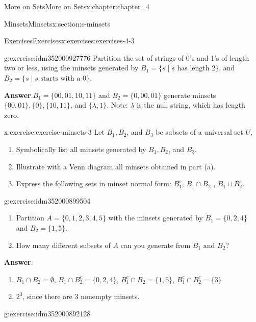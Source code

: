 \documentclass[oneside,10pt,]{book}
\newcommand{\blocktitlefont}{\relax}
\begin{document}
\begin{chapterptx}{More on Sets}{}{More on Sets}{}{}{x:chapter:chapter_4}
\begin{sectionptx}{Minsets}{}{Minsets}{}{}{x:section:s-minsets}
\begin{exercises-subsection}{Exercises}{}{Exercises}{}{}{x:exercises:exercises-4-3}
\begin{divisionexercise}{3}{}{}{g:exercise:idm352000927776}
Partition the set of strings of 0's and 1's of length two or less, using the minsets generated by \(B_1=\{s \mid s \textrm{ has length } 2\}\), and \(B_2= \{s \mid s \textrm{ starts with a }   0\}\).%
\par\smallskip%
\noindent\textbf{\blocktitlefont Answer}.\hypertarget{g:answer:idm352000908720}{}\quad{}\(B_1= \{00, 01, 10, 11\}\) and \(B_2 = \{0, 00, 01\}\) generate minsets \(\{00, 01\}, \{0\}, \{10, 11\}\), and \(\{\lambda , 1\}\). Note: \(\lambda\) is the null string, which has length zero.%
\end{divisionexercise}%
\begin{divisionexercise}{4}{}{}{x:exercise:exercise-minsets-3}%
Let \(B_1, B_2\), and \(B_3\) be subsets of a universal set \(U\),%
\par
%
\begin{enumerate}[label=(\alph*)]
\item{}Symbolically list all minsets generated by \(B_1, B_2\), and \(B_3\).%
\item{}Illustrate with a Venn diagram all minsets obtained in part (a).%
\item{}Express the following sets in minset normal form: \(B_1^c\), \(B_1\cap B_2\) , \(B_1\cup B_2^c\).%
\end{enumerate}
%
\end{divisionexercise}%
\begin{divisionexercise}{5}{}{}{g:exercise:idm352000899504}%
%
\begin{enumerate}[label=(\alph*)]
\item{}Partition \(A = \{0, 1, 2, 3, 4, 5\}\) with the minsets generated by \(B_1= \{0, 2, 4\}\text{  }\)and \(B_2= \{1, 5\}\).%
\item{}How many different subsets of \(A\) can you generate from  \(B_1 \textrm{ and } B_2\)?%
\end{enumerate}
%
\par\smallskip%
\noindent\textbf{\blocktitlefont Answer}.\hypertarget{g:answer:idm352000895616}{}\quad{}%
\begin{enumerate}[label=(\alph*)]
\item{}\(B_1\cap B_2=\emptyset\),  \(B_1\cap B_2^c=\{0,2,4\}\), \(B_1^c\cap B_2=\{1,5\}\), \(B_1^c\cap B_2^c=\{3\}\)%
\item{}\(2^3\), since there are 3 nonempty minsets.%
\end{enumerate}
%
\end{divisionexercise}%
\begin{divisionexercise}{6}{}{}{g:exercise:idm352000892128}%

\end{divisionexercise}
\end{exercises-subsection}
\end{sectionptx}
\end{chapterptx}
\end{document}
